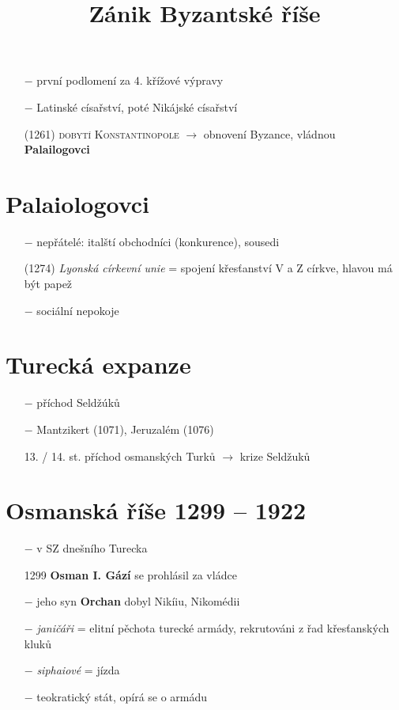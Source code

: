 \documentclass{article}
\title{\vspace{-2cm}Zánik Byzantské říše\vspace{-1.7cm}}
\date{}
\author{}
\begin{document}
\maketitle

\begin{itemize}
    \vspace{-0.5em}
    \setlength\itemsep{0.15em}
    \item[$-$] první podlomení za 4. křížové výpravy
    \item[$-$] Latinské císařství, poté Nikájské císařství
    \item[(1261)] \textsc{dobytí Konstantinopole} $\rightarrow$ obnovení Byzance, vládnou \textbf{Palailogovci}
\end{itemize}

\section*{Palaiologovci}
\begin{itemize}
    \vspace{-0.5em}
    \setlength\itemsep{0.15em}
    \item[$-$] nepřátelé: italští obchodníci (konkurence), sousedi
    \item[(1274)] \textit{Lyonská církevní unie} = spojení křesťanství V a Z církve, hlavou má být papež
    \item[$-$] sociální nepokoje
\end{itemize}


\section*{Turecká expanze}
\begin{itemize}
    \vspace{-0.5em}
    \setlength\itemsep{0.15em}
    \item[$-$] příchod Seldžúků
    \item[$-$] Mantzikert (1071), Jeruzalém (1076)
    \item[13. / 14. st.] příchod osmanských Turků $\rightarrow$ krize Seldžuků
\end{itemize}


\section*{Osmanská říše 1299 -- 1922}
\begin{itemize}
    \vspace{-0.5em}
    \setlength\itemsep{0.15em}
    \item[$-$] v SZ dnešního Turecka
    \item[1299] \textbf{Osman I. Gází} se prohlásil za vládce
    \item[$-$] jeho syn \textbf{Orchan} dobyl Nikíiu, Nikomédii
    \item[$-$] \textit{janičáři} = elitní pěchota turecké armády, rekrutováni z řad křesťanských kluků
    \item[$-$] \textit{siphaiové} = jízda
    \item[$-$] teokratický stát, opírá se o armádu
\end{itemize}
\end{document}
